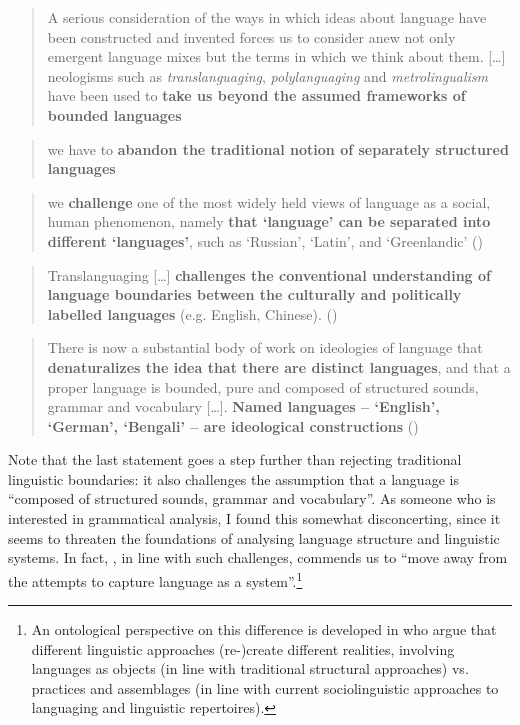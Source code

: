 \begin{quote}
A serious consideration of the ways in which ideas about language have been constructed and invented forces us to consider anew not only emergent language mixes but the terms in which we think about them. […] neologisms such as \textit{translanguaging}, \textit{polylanguaging} and \textit{metrolingualism} have been used to \textbf{take us beyond the assumed frameworks of bounded languages} \citep[3]{Pennycook2018}
\end{quote}

\begin{quote}
we have to \textbf{abandon the traditional notion of separately structured languages} \citep[34]{Canagarajah2018}
\end{quote}

\begin{quote}
we \textbf{challenge} one of the most widely held views of language as a social, human phenomenon, namely \textbf{that ‘language’ can be separated into different ‘languages’}, such as ‘Russian’, ‘Latin’, and ‘Greenlandic’ (\citealt[22]{JorgensenEtAl2011})
\end{quote}

\begin{quote}
Translanguaging […] \textbf{challenges the conventional understanding of language boundaries between the culturally and politically labelled languages} (e.g. English, Chinese). (\citealt[3f]{LiWei2016})
\end{quote}

\begin{quote}
There is now a substantial body of work on ideologies of language that \textbf{denaturalizes the idea that there are distinct languages}, and that a proper language is bounded, pure and composed of structured sounds, grammar and vocabulary […]. \textbf{Named languages – ‘English’, ‘German’, ‘Bengali’ – are ideological constructions} (\citealt[3--4]{BlommaertRampton2011})
\end{quote}

Note that the last statement goes a step further than rejecting traditional linguistic boundaries: it also challenges the assumption that a language is “composed of structured sounds, grammar and vocabulary”. As someone who is interested in grammatical analysis, I found this somewhat disconcerting, since it seems to threaten the foundations of analysing language structure and linguistic systems. In fact, \citet[114]{Pennycook2010}, in line with such challenges, commends us to “move away from the attempts to capture language as a system”.\footnote{An ontological perspective on this difference is developed in \citet{DemuroGurney2021} who argue that different linguistic approaches (re-)create different realities, involving languages as objects (in line with traditional structural approaches) vs. practices and assemblages (in line with current sociolinguistic approaches to languaging and linguistic repertoires).}

